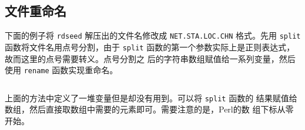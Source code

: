 \subsection{文件重命名}
\label{subsec:rename-in-perl}
下面的例子将 \texttt{rdseed} 解压出的文件名修改成 \texttt{NET.STA.LOC.CHN}
格式。先用 \texttt{split} 函数将文件名用点号分割，由于 \texttt{split}
函数的第一个参数实际上是正则表达式，故而这里的点号需要转义。点号分割之
后的字符串数组赋值给一系列变量，然后使用 \texttt{rename} 函数实现重命名。
\inputminted{perl}{./call-in-script/rename1.pl}

上面的方法中定义了一堆变量但是却没有用到。可以将 \texttt{split} 函数的
结果赋值给数组，然后直接取数组中需要的元素即可。需要注意的是，Perl的数
组下标从零开始。
\inputminted{perl}{./call-in-script/rename2.pl}
